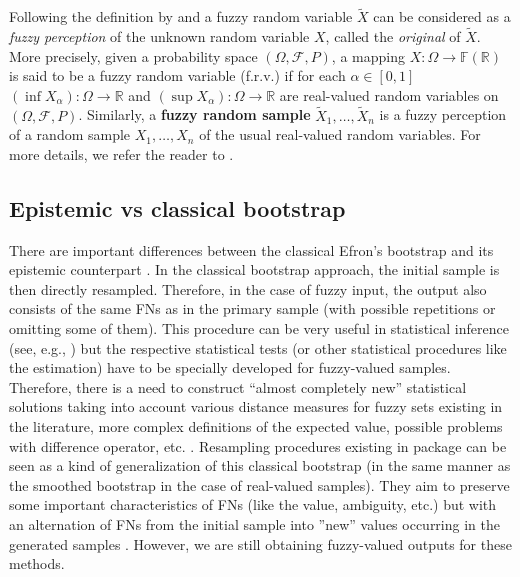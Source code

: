 Following the definition by \cite{Kwakernaak} and \cite{Kruse1982} a fuzzy random variable $\widetilde{X}$ can be considered as a \textit{fuzzy perception} of the unknown random variable $X$, called the \textit{original} of $\widetilde{X}$. More precisely, given a probability space $(\Omega,\mathcal{F},P)$, a mapping $X:\Omega \to\mathbb{F}(\mathbb{R})$ is said to be a fuzzy random variable (f.r.v.) if for each $\alpha\in [0,1]$ $(\inf X_\alpha):\Omega\to\mathbb{R}$ and $(\sup X_\alpha):\Omega\to\mathbb{R}$ are real-valued random variables on $(\Omega,\mathcal{F},P)$. Similarly, a \textbf{fuzzy random sample} $\widetilde{X}_1,\ldots,\widetilde{X}_n$ is a fuzzy perception of a random sample $X_1,\ldots,X_n$ of the usual real-valued random variables. For more details, we refer the reader to \cite{Kwakernaak,Kruse1982}.

\subsection{Epistemic vs classical bootstrap}

There are important differences between the classical Efron's bootstrap \citep{EfroTibs93} and its epistemic counterpart \citep{grzegorzewski2021,pgmr2022,PGMR2024AMS}.
In the classical bootstrap approach, the initial sample is then directly resampled.
Therefore, in the case of fuzzy input, the output also consists of the same FNs as in the primary sample (with possible repetitions or omitting some of them).
This procedure can be very useful in statistical inference (see, e.g., \citep{gil,LUBIANO2016918,Montenegro2004}) but the respective statistical tests (or other statistical procedures like the estimation) have to be specially developed for fuzzy-valued samples.
Therefore, there is a need to construct ``almost completely new'' statistical solutions taking into account various distance measures for fuzzy sets existing in the literature, more complex definitions of the expected value, possible problems with difference operator, etc. \citep{ban_coroianu_pg,HEILPERN199281}.
Resampling procedures existing in  package can be seen as a kind of generalization of this classical bootstrap (in the same manner as the smoothed bootstrap in the case of real-valued samples).
They aim to preserve some important characteristics of FNs (like the value, ambiguity, etc.) but with an alternation of FNs from the initial sample into ''new'' values occurring in the generated samples \citep{grzegorzewski_amcs2020,GrzegorzewskiRom2021}.
However, we are still obtaining fuzzy-valued outputs for these methods.

